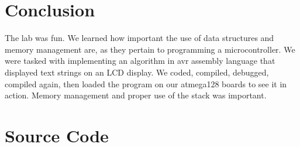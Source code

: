 \documentclass[12pt, letterpaper]{article}
\begin{document}
\section{Conclusion}
The lab was fun. We learned how important the use of data structures and memory management are, as they pertain to programming a microcontroller. We were tasked with implementing an algorithm in avr assembly language that displayed text strings on an LCD display. We coded, compiled, debugged, compiled again, then loaded the program on our atmega128 boards to see it in action. Memory management and proper use of the stack was important.


\section{Source Code}
\end{document}
